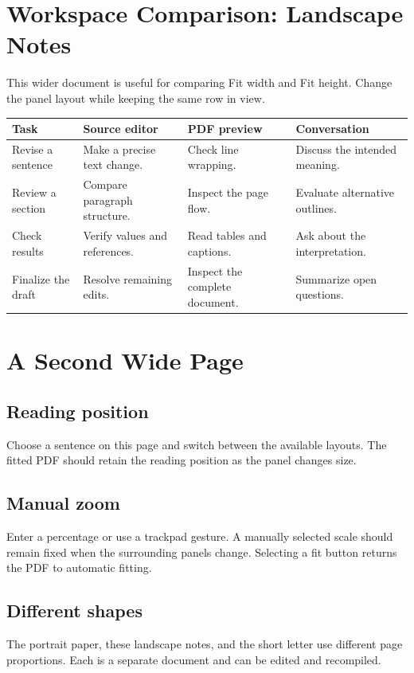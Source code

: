 \documentclass[12pt,a4paper,landscape]{article}
\begin{document}
\section*{Workspace Comparison: Landscape Notes}
This wider document is useful for comparing Fit width and Fit height.
Change the panel layout while keeping the same row in view.

\bigskip
\begin{center}
\begin{tabular}{p{35mm}p{57mm}p{57mm}p{57mm}}
\hline
Task & Source editor & PDF preview & Conversation \\
\hline
Revise a sentence & Make a precise text change. & Check line wrapping. & Discuss the intended meaning. \\
Review a section & Compare paragraph structure. & Inspect the page flow. & Evaluate alternative outlines. \\
Check results & Verify values and references. & Read tables and captions. & Ask about the interpretation. \\
Finalize the draft & Resolve remaining edits. & Inspect the complete document. & Summarize open questions. \\
\hline
\end{tabular}
\end{center}

\newpage
\section*{A Second Wide Page}
\subsection*{Reading position}
Choose a sentence on this page and switch between the available layouts.
The fitted PDF should retain the reading position as the panel changes size.

\subsection*{Manual zoom}
Enter a percentage or use a trackpad gesture. A manually selected scale should
remain fixed when the surrounding panels change. Selecting a fit button returns
the PDF to automatic fitting.

\subsection*{Different shapes}
The portrait paper, these landscape notes, and the short letter use different
page proportions. Each is a separate document and can be edited and recompiled.
\end{document}
